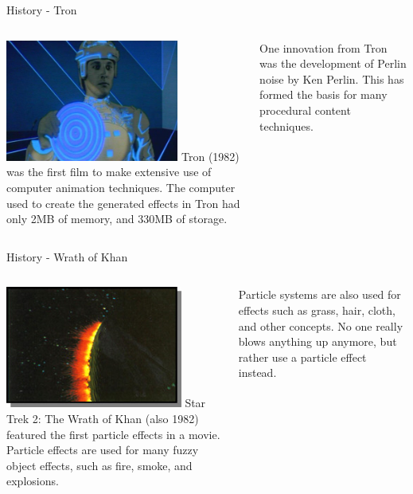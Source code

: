 \documentclass[handout,18pt]{beamer}
\begin{document}
\begin{frame}{History - Tron}
\begin{columns}
\includegraphics[height=4cm]{tron.jpg}
Tron (1982) was the first film to make extensive use of computer animation techniques.  The computer used to create the generated effects in Tron had only 2MB of memory, and 330MB of storage.

\vspace{11pt}
One innovation from Tron was the development of Perlin noise by Ken Perlin.  This has formed the basis for many procedural content techniques.
\end{columns}
\end{frame}

\begin{frame}{History - Wrath of Khan}
\begin{columns}
\includegraphics[height=4cm]{khan.jpg}
Star Trek 2: The Wrath of Khan (also 1982) featured the first particle effects in a movie.  Particle effects are used for many fuzzy object effects, such as fire, smoke, and explosions.

\vspace{11pt}
Particle systems are also used for effects such as grass, hair, cloth, and other concepts.  No one really blows anything up anymore, but rather use a particle effect instead.
\end{columns}
\end{frame}
\end{document}
